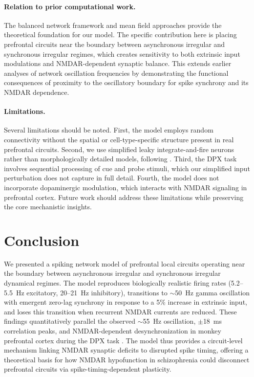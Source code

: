 \documentclass[10pt]{article}
\begin{document}
\paragraph{Relation to prior computational work.}
The balanced network framework \citep{vanvreeswijk1996chaos,
brunel2000dynamics, renart2010asynchronous} and mean field approaches
\citep{amit1997model, brunel2001effects} provide the theoretical foundation
for our model. The specific contribution here is placing prefrontal circuits
near the boundary between asynchronous irregular and synchronous irregular
regimes, which creates sensitivity to both extrinsic input modulations and
NMDAR-dependent synaptic balance. This extends earlier analyses of network
oscillation frequencies \citep{brunel2003fast, brunel1999fast} by
demonstrating the functional consequences of proximity to the oscillatory
boundary for spike synchrony and its NMDAR dependence.

\paragraph{Limitations.}
Several limitations should be noted. First, the model employs random
connectivity without the spatial or cell-type-specific structure present in
real prefrontal circuits. Second, we use simplified leaky integrate-and-fire
neurons rather than morphologically detailed models, following
\citet{dayan2001theoretical, brunel2000dynamics}. Third, the DPX task
involves sequential processing of cue and probe stimuli, which our simplified
input perturbation does not capture in full detail. Fourth, the model does
not incorporate dopaminergic modulation, which interacts with NMDAR signaling
in prefrontal cortex. Future work should address these limitations while
preserving the core mechanistic insights.

\section{Conclusion}

We presented a spiking network model of prefrontal local circuits operating
near the boundary between asynchronous irregular and synchronous irregular
dynamical regimes. The model reproduces biologically realistic firing rates
(5.2--5.5~Hz excitatory, 20--21~Hz inhibitory), transitions to $\sim$50~Hz
gamma oscillation with emergent zero-lag synchrony in response to a 5\%
increase in extrinsic input, and loses this transition when recurrent NMDAR
currents are reduced. These findings quantitatively parallel the observed
$\sim$55~Hz oscillation, $\pm$18~ms correlation peaks, and NMDAR-dependent
desynchronization in monkey prefrontal cortex during the DPX task
\citep{zick2018blocking}. The model thus provides a circuit-level mechanism
linking NMDAR synaptic deficits to disrupted spike timing, offering a
theoretical basis for how NMDAR hypofunction in schizophrenia could
disconnect prefrontal circuits via spike-timing-dependent plasticity.



\end{document}
